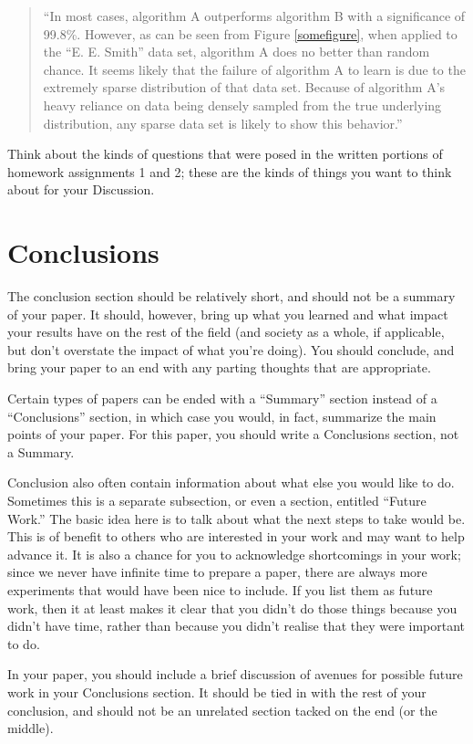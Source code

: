 \documentclass[12pt, letterpaper]{article}
\begin{document}
\begin{quote}
``In most cases, algorithm A outperforms algorithm B with a significance of
99.8\%.  However, as can be seen from Figure \ref{somefigure}, when applied to
the ``E. E. Smith'' data set, algorithm A does no better than random chance.  It
seems likely that the failure of algorithm A to learn is due to the extremely
sparse distribution of that data set.  Because of algorithm A's heavy reliance
on data being densely sampled from the true underlying distribution, any sparse
data set is likely to show this behavior.''
\end{quote}

Think about the kinds of questions that were posed in the written portions of
homework assignments 1 and 2; these are the kinds of things you want to think
about for your Discussion.

\section{Conclusions}
The conclusion section should be relatively short, and should not be a summary
of your paper.  It should, however, bring up what you learned and what impact
your results have on the rest of the field (and society as a whole, if
applicable, but don't overstate the impact of what you're doing).  You should
conclude, and bring your paper to an end with any parting thoughts that are
appropriate.

Certain types of papers can be ended with a ``Summary'' section instead of a
``Conclusions'' section, in which case you would, in fact, summarize the main
points of your paper.  For this paper, you should write a Conclusions section,
not a Summary.

Conclusion also often contain information about what else you would like
to do.  Sometimes this is a separate subsection, or even a section, entitled
``Future Work.''  The basic idea here is to talk about what the next steps to
take would be.  This is of benefit to others who are interested in your
work and may want to help advance it.  It is also a chance for you to
acknowledge shortcomings in your work; since we never have infinite time to
prepare a paper, there are always more experiments that would have been nice to
include.  If you list them as future work, then it at least makes it clear that
you didn't do those things because you didn't have time, rather than because you
didn't realise that they were important to do.

In your paper, you should include a brief discussion of avenues for possible
future work in your Conclusions section.  It should be tied in with the rest of
your conclusion, and should not be an unrelated section tacked on the end (or
the middle).





\end{document}
